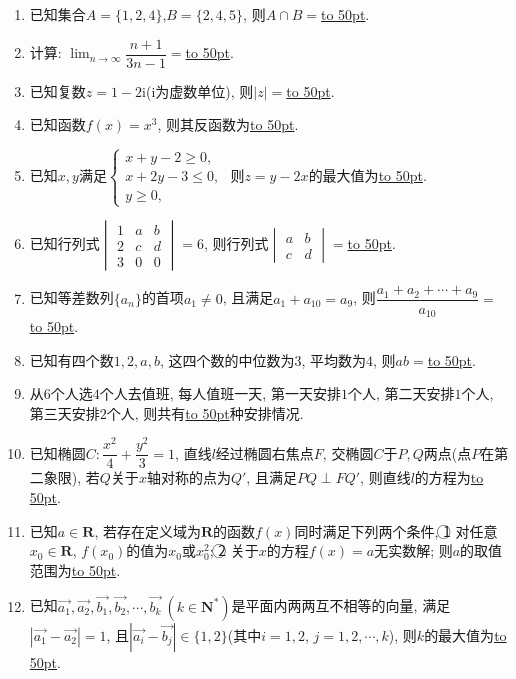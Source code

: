 \documentclass[10pt,a4paper]{article}
\newcommand{\blank}[1]{\underline{\hbox to #1pt{}}}
\begin{document}
\begin{enumerate}[1.]
\item 已知集合$A=\{1,2,4\}$,$B=\{2,4,5\}$, 则$A\cap B=$\blank{50}.
\item 计算: $\displaystyle\lim_{n\to\infty}\dfrac{n+1}{3n-1}=$\blank{50}.
\item 已知复数$z=1-2 \mathrm{i}$($\mathrm{i}$为虚数单位), 则$|z|=$\blank{50}.
\item 已知函数$f(x)=x^3$, 则其反函数为\blank{50}.
\item 已知$x,y$满足$\begin{cases}x+y-2 \ge 0, \\ x+2y-3 \le 0, \\ y\ge 0, \end{cases}$ 则$z=y-2x$的最大值为\blank{50}.
\item 已知行列式$\begin{vmatrix}1 & a & b  \\ 2 & c & d  \\ 3 & 0 & 0 \end{vmatrix}=6$, 则行列式$\begin{vmatrix} a & b  \\ c & d \end{vmatrix}=$\blank{50}.
\item 已知等差数列$\{a_n\}$的首项$a_1\ne 0$, 且满足$a_1+a_{10}=a_9$, 则$\dfrac{a_1+a_2+\cdots+a_9}{a_{10}}=$\blank{50}.
\item 已知有四个数$1,2,a,b$, 这四个数的中位数为$3$, 平均数为$4$, 则$ab=$\blank{50}.
\item 从$6$个人选$4$个人去值班, 每人值班一天, 第一天安排$1$个人, 第二天安排$1$个人, 第三天安排$2$个人, 则共有\blank{50}种安排情况.
\item 已知椭圆$C:\dfrac{x^2}4+\dfrac{y^2}3=1$, 直线$l$经过椭圆右焦点$F$, 交椭圆$C$于$P,Q$两点(点$P$在第二象限), 若$Q$关于$x$轴对称的点为$Q'$, 且满足$PQ\perp FQ'$, 则直线$l$的方程为\blank{50}.
\item 已知$a\in \mathbf{R}$, 若存在定义域为$\mathbf{R}$的函数$f(x)$同时满足下列两个条件, \textcircled{1} 对任意$x_0\in \mathbf{R}$, $f(x_0)$的值为$x_0$或$x_0^2$; \textcircled{2} 关于$x$的方程$f(x)=a$无实数解; 则$a$的取值范围为\blank{50}.	
\item 已知$\overrightarrow{a_1}, \overrightarrow{a_2}, \overrightarrow{b_1}, \overrightarrow{b_2},\cdots,\overrightarrow{b_k}\ (k\in \mathbf{N}^*)$是平面内两两互不相等的向量, 满足$|\overrightarrow{a_1}-\overrightarrow{a_2}|=1$, 且$|\overrightarrow{a_i}-\overrightarrow{b_j}|\in \{1,2\}$(其中$i=1,2$, $j=1,2,\cdots,k$), 则$k$的最大值为\blank{50}.

\end{enumerate}
\end{document}
